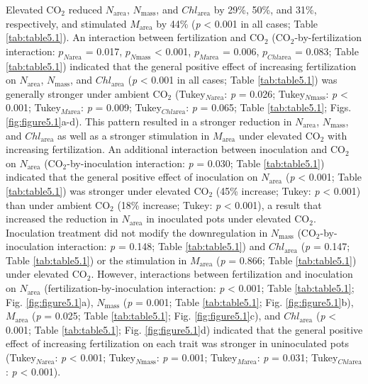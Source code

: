 Elevated CO$_2$ reduced $N_\mathrm{area}$, $N_\mathrm{mass}$, and $Chl_\mathrm{area}$ by 29\%, 50\%, and 31\%, respectively, and stimulated $M_\mathrm{area}$ by 44\% (\textit{p} < 0.001 in all cases; Table \ref{tab:table5.1}). An interaction between fertilization and CO$_2$ (CO$_2$-by-fertilization interaction: $p_{N\mathrm{area}}$ = 0.017, $p_{N\mathrm{mass}}$ < 0.001, $p_{M\mathrm{area}}$ = 0.006, $p_{Chl\mathrm{area}}$ = 0.083; Table \ref{tab:table5.1}) indicated that the general positive effect of increasing fertilization on $N_\mathrm{area}$, $N_\mathrm{mass}$, and $Chl_\mathrm{area}$ (\textit{p} < 0.001 in all cases; Table \ref{tab:table5.1}) was generally stronger under ambient CO$_2$ (Tukey$_{N\mathrm{area}}$: \textit{p} = 0.026; Tukey$_{N\mathrm{mass}}$: \textit{p} < 0.001; Tukey$_{M\mathrm{area}}$: \textit{p} = 0.009; Tukey$_{Chl\mathrm{area}}$: \textit{p} = 0.065; Table \ref{tab:table5.1}; Figs. \ref{fig:figure5.1}a-d). This pattern resulted in a stronger reduction in $N_\mathrm{area}$, $N_\mathrm{mass}$, and $Chl_\mathrm{area}$  as well as a stronger stimulation in $M_\mathrm{area}$ under elevated CO$_2$ with increasing fertilization. An additional interaction between inoculation and CO$_2$ on $N_\mathrm{area}$ (CO$_2$-by-inoculation interaction: \textit{p} = 0.030; Table \ref{tab:table5.1}) indicated that the general positive effect of inoculation on $N_\mathrm{area}$ (\textit{p} < 0.001; Table \ref{tab:table5.1}) was stronger under elevated CO$_2$ (45\% increase; Tukey: \textit{p} < 0.001) than under ambient CO$_2$ (18\% increase; Tukey: \textit{p} < 0.001), a result that increased the reduction in $N_\mathrm{area}$ in inoculated pots under elevated CO$_2$. Inoculation treatment did not modify the downregulation in $N_\mathrm{mass}$ (CO$_2$-by-inoculation interaction: \textit{p} = 0.148; Table \ref{tab:table5.1}) and $Chl_\mathrm{area}$ (\textit{p} = 0.147; Table \ref{tab:table5.1}) or the stimulation in $M_\mathrm{area}$ (\textit{p} = 0.866; Table \ref{tab:table5.1}) under elevated CO$_2$. However, interactions between fertilization and inoculation on $N_\mathrm{area}$ (fertilization-by-inoculation interaction: \textit{p} < 0.001; Table \ref{tab:table5.1}; Fig. \ref{fig:figure5.1}a), $N_\mathrm{mass}$ (\textit{p} = 0.001; Table \ref{tab:table5.1}; Fig. \ref{fig:figure5.1}b), $M_\mathrm{area}$ (\textit{p} = 0.025; Table \ref{tab:table5.1}; Fig. \ref{fig:figure5.1}c), and $Chl_\mathrm{area}$ (\textit{p} < 0.001; Table \ref{tab:table5.1}; Fig. \ref{fig:figure5.1}d) indicated that the general positive effect of increasing fertilization on each trait was stronger in uninoculated pots (Tukey$_{N\mathrm{area}}$: \textit{p} < 0.001; Tukey$_{N\mathrm{mass}}$: \textit{p} = 0.001; Tukey$_{M\mathrm{area}}$: \textit{p} = 0.031; Tukey$_{Chl\mathrm{area}}$: \textit{p} < 0.001).

